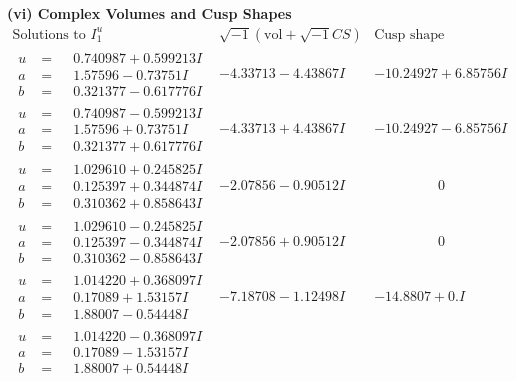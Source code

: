 \documentclass[1p]{elsarticle_modified}
\theoremstyle{definition}
\newcommand{\I}{\sqrt{-1}}
\begin{document}
\newpage\flushleft \textbf{(vi) Complex Volumes and Cusp Shapes}
$$\begin{array}{c|c|c}  
\text{Solutions to }I^u_{1}& \I (\text{vol} + \sqrt{-1}CS) & \text{Cusp shape}\\
 \hline 
\begin{aligned}
u &= \phantom{-}0.740987 + 0.599213 I \\
a &= \phantom{-}1.57596 - 0.73751 I \\
b &= \phantom{-}0.321377 - 0.617776 I\end{aligned}
 & -4.33713 - 4.43867 I & -10.24927 + 6.85756 I \\ \hline\begin{aligned}
u &= \phantom{-}0.740987 - 0.599213 I \\
a &= \phantom{-}1.57596 + 0.73751 I \\
b &= \phantom{-}0.321377 + 0.617776 I\end{aligned}
 & -4.33713 + 4.43867 I & -10.24927 - 6.85756 I \\ \hline\begin{aligned}
u &= \phantom{-}1.029610 + 0.245825 I \\
a &= \phantom{-}0.125397 + 0.344874 I \\
b &= \phantom{-}0.310362 + 0.858643 I\end{aligned}
 & -2.07856 - 0.90512 I & \phantom{-0.000000 } 0 \\ \hline\begin{aligned}
u &= \phantom{-}1.029610 - 0.245825 I \\
a &= \phantom{-}0.125397 - 0.344874 I \\
b &= \phantom{-}0.310362 - 0.858643 I\end{aligned}
 & -2.07856 + 0.90512 I & \phantom{-0.000000 } 0 \\ \hline\begin{aligned}
u &= \phantom{-}1.014220 + 0.368097 I \\
a &= \phantom{-}0.17089 + 1.53157 I \\
b &= \phantom{-}1.88007 - 0.54448 I\end{aligned}
 & -7.18708 - 1.12498 I & -14.8807 + 0. I\phantom{ +0.000000I} \\ \hline\begin{aligned}
u &= \phantom{-}1.014220 - 0.368097 I \\
a &= \phantom{-}0.17089 - 1.53157 I \\
b &= \phantom{-}1.88007 + 0.54448 I\end{aligned}

\end{array}$$
\end{document}
